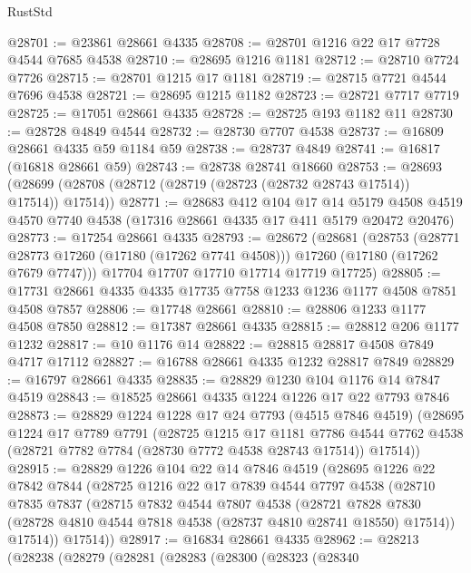 \begin{lexlean}{RustStd}
\begin{coremodule}
@28701 := @23861 @28661 @4335
@28708 := @28701 @1216 @22 @17 @7728 @4544 @7685 @4538
@28710 := @28695 @1216 @1181
@28712 := @28710 @7724 @7726
@28715 := @28701 @1215 @17 @1181
@28719 := @28715 @7721 @4544 @7696 @4538
@28721 := @28695 @1215 @1182
@28723 := @28721 @7717 @7719
@28725 := @17051 @28661 @4335
@28728 := @28725 @193 @1182 @11
@28730 := @28728 @4849 @4544
@28732 := @28730 @7707 @4538
@28737 := @16809 @28661 @4335 @59 @1184 @59
@28738 := @28737 @4849
@28741 := @16817 (@16818 @28661 @59)
@28743 := @28738 @28741 @18660
@28753 := @28693 (@28699 (@28708 (@28712 (@28719 (@28723 (@28732 @28743 @17514)) @17514)) @17514))
@28771 := @28683
    @412
    @104
    @17
    @14
    @5179
    @4508
    @4519
    @4570
    @7740
    @4538
    (@17316 @28661 @4335 @17 @411 @5179 @20472 @20476)
@28773 := @17254 @28661 @4335
@28793 := @28672
    (@28681
      (@28753
        (@28771 @28773 @17260 (@17180 (@17262 @7741 @4508)))
        @17260
        (@17180 (@17262 @7679 @7747)))
      @17704
      @17707
      @17710
      @17714
      @17719
      @17725)
@28805 := @17731 @28661 @4335 @4335 @17735 @7758 @1233 @1236 @1177 @4508 @7851 @4508 @7857
@28806 := @17748 @28661
@28810 := @28806 @1233 @1177 @4508 @7850
@28812 := @17387 @28661 @4335
@28815 := @28812 @206 @1177 @1232
@28817 := @10 @1176 @14
@28822 := @28815 @28817 @4508 @7849 @4717 @17112
@28827 := @16788 @28661 @4335 @1232 @28817 @7849
@28829 := @16797 @28661 @4335
@28835 := @28829 @1230 @104 @1176 @14 @7847 @4519
@28843 := @18525 @28661 @4335 @1224 @1226 @17 @22 @7793 @7846
@28873 := @28829
    @1224
    @1228
    @17
    @24
    @7793
    (@4515 @7846 @4519)
    (@28695
      @1224
      @17
      @7789
      @7791
      (@28725
        @1215
        @17
        @1181
        @7786
        @4544
        @7762
        @4538
        (@28721 @7782 @7784 (@28730 @7772 @4538 @28743 @17514))
        @17514))
@28915 := @28829
    @1226
    @104
    @22
    @14
    @7846
    @4519
    (@28695
      @1226
      @22
      @7842
      @7844
      (@28725
        @1216
        @22
        @17
        @7839
        @4544
        @7797
        @4538
        (@28710
          @7835
          @7837
          (@28715
            @7832
            @4544
            @7807
            @4538
            (@28721
              @7828
              @7830
              (@28728 @4810 @4544 @7818 @4538 (@28737 @4810 @28741 @18550) @17514))
            @17514))
        @17514))
@28917 := @16834 @28661 @4335
@28962 := @28213
    (@28238
      (@28279
        (@28281
          (@28283
            (@28300
              (@28323
                (@28340

\end{coremodule}
\end{lexlean}
